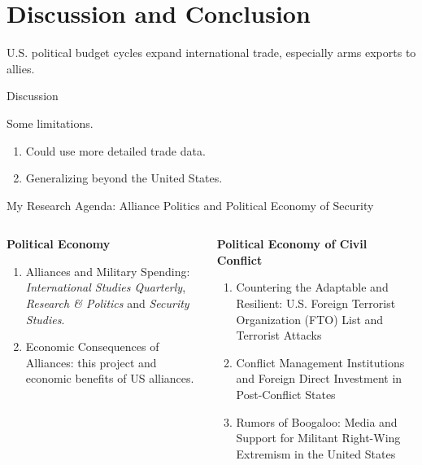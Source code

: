\documentclass[12pt]{beamer}
\begin{document}



\section{Discussion and Conclusion} 



\begin{frame}[standout]

U.S. political budget cycles expand international trade, especially arms exports to allies.  

\end{frame}


\begin{frame}{Discussion}

Some limitations. 

\pause
\begin{enumerate}
\item Could use more detailed trade data. 
\pause
\item Generalizing beyond the United States. 
\end{enumerate} 

\end{frame}


\begin{frame}{My Research Agenda: Alliance Politics and Political Economy of Security}

\begin{columns}

\begin{column}{0.5\textwidth}
\textbf{Political Economy}
\begin{enumerate} 
\item Alliances and Military Spending: \textit{International Studies Quarterly}, \textit{Research \& Politics} and  \textit{Security Studies}.
\item Economic Consequences of Alliances: this project and economic benefits of US alliances. 
\end{enumerate} 
\end{column}


\begin{column}{0.5\textwidth}
\textbf{Political Economy of Civil Conflict}
\begin{enumerate}
\item Countering the Adaptable and Resilient: U.S. Foreign Terrorist Organization (FTO) List and Terrorist Attacks 
\item Conflict Management Institutions and Foreign Direct Investment in Post-Conflict States
\item Rumors of Boogaloo: Media and Support for Militant Right-Wing Extremism in the United States 
\end{enumerate} 
\end{column}


\end{columns}
 

\end{frame}
\end{document}
